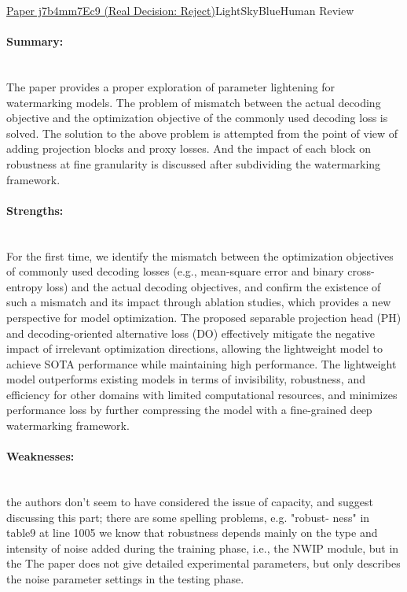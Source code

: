 \documentclass{article} %
\begin{document}
\begin{reviewbox}{\href{https://openreview.net/forum?id=j7b4mm7Ec9}{Paper j7b4mm7Ec9 (Real Decision: Reject)}}{LightSkyBlue}{Human Review}
\scriptsize
\paragraph{Summary:}\leavevmode\\[0.1em]
The paper provides a proper exploration of parameter lightening for watermarking models. The problem of mismatch between the actual decoding objective and the optimization objective of the commonly used decoding loss is solved. The solution to the above problem is attempted from the point of view of adding projection blocks and proxy losses. And the impact of each block on robustness at fine granularity is discussed after subdividing the watermarking framework.

\paragraph{Strengths:}\leavevmode\\[0.1em]
For the first time, we identify the mismatch between the optimization objectives of commonly used decoding losses (e.g., mean-square error and binary cross-entropy loss) and the actual decoding objectives, and confirm the existence of such a mismatch and its impact through ablation studies, which provides a new perspective for model optimization. The proposed separable projection head (PH) and decoding-oriented alternative loss (DO) effectively mitigate the negative impact of irrelevant optimization directions, allowing the lightweight model to achieve SOTA performance while maintaining high performance. The lightweight model outperforms existing models in terms of invisibility, robustness, and efficiency for other domains with limited computational resources, and minimizes performance loss by further compressing the model with a fine-grained deep watermarking framework.

\paragraph{Weaknesses:}\leavevmode\\[0.1em]
the authors don't seem to have considered the issue of capacity, and suggest discussing this part;
there are some spelling problems, e.g. "robust- ness" in table9 at line 1005 we know that robustness depends mainly on the type and intensity of noise added during the training phase, i.e., the NWIP module, but in the The paper does not give detailed experimental parameters, but only describes the noise parameter settings in the testing phase.


\end{reviewbox}
\end{document}
